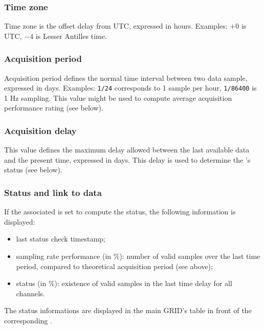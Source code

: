 \subsubsection{Time zone}

Time zone is the offset delay from UTC, expressed in hours. Examples: $+0$ is UTC, $-4$ is Lesser Antilles time.

\subsubsection{Acquisition period}

Acquisition period defines the normal time interval between two data sample, expressed in days. Examples: \texttt{1/24} corresponds to 1 sample per hour, \texttt{1/86400} is 1 Hz sampling. This value might be used to compute average acquisition performance rating (see below).

\subsubsection{Acquisition delay}

This value defines the maximum delay allowed between the last available data and the present time, expressed in days. This delay is used to determine the 's status (see below).

\subsubsection{Status and link to data}

If the associated  is set to compute the  status, the following information is displayed:
\begin{itemize}
\item last status check timestamp;
\item sampling rate performance (in \%): number of valid samples over the last time period, compared to theoretical acquisition period (see above);
\item status (in \%): existence of valid samples in the last time delay for all channels.
\end{itemize}

The status informations are displayed in the main GRID's table in front of the corresponding .


